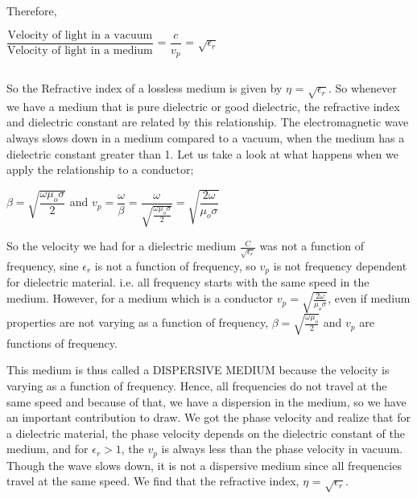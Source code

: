 Therefore,
\begin{center}
$\dfrac{\text{Velocity of light in a vacuum}}{\text{Velocity of light in a medium}}$	
= $\dfrac{c}{v_{p}}$ = $\sqrt{\epsilon_{r}}$  
\end{center}
\begin{equation}\end{equation}

So the Refractive index of a lossless medium is given by  $\eta$ = $\sqrt{\epsilon_{r}}$. So whenever we have a medium that is pure dielectric or good dielectric, the refractive index and dielectric constant are related by this relationship. The electromagnetic wave always slows down in a medium compared to a vacuum, when the medium has a dielectric constant greater than 1.
Let us take a look at what happens when we apply the relationship to a conductor;

$\beta=\sqrt{\dfrac{\omega\mu_{o}\sigma}{2}}$  and   $v_p=\dfrac{\omega}{\beta}=\dfrac{\omega}{\sqrt{\frac{\omega\mu_{o}\sigma}{2}}}=\sqrt{\dfrac{2\omega}{\mu_{o}\sigma}}$
\begin{equation}\end{equation}

So the velocity we had for a dielectric medium $\frac{C}{\sqrt{\epsilon_{r}}}$ was not a function of frequency, sine $\epsilon_{r}$ is not a function of frequency, so $v_p$ is not frequency dependent for dielectric material. i.e. all frequency starts with the same speed in the medium.
However, for a medium which is a conductor $v_p=\sqrt{\frac{2\omega}{\mu_{o}\sigma}}$, even if medium properties are not varying as a function of frequency, $\beta=\sqrt{\frac{\omega\mu_{o}}{2}}$ and $v_p$ are functions of frequency.

This medium is thus called a DISPERSIVE MEDIUM because the velocity is varying as a function of frequency. Hence, all frequencies do not travel at the same speed and because of that, we have a dispersion in the medium, so we have an important contribution to draw.
We got the phase velocity and realize that for a dielectric material, the phase velocity depends on the dielectric constant of the medium, and for $\epsilon_{r} > 1$, the $v_p$ is always less than the phase velocity in vacuum. Though the wave slows down, it is not a dispersive medium since all frequencies travel at the same speed. We find that the refractive index, $\eta$ = $\sqrt{\epsilon_{r}}$.


